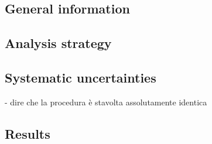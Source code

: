 \subsection{General information}
\subsection{Analysis strategy}


\subsection{Systematic uncertainties}
- dire che la procedura è stavolta assolutamente identica


\subsection{Results}


